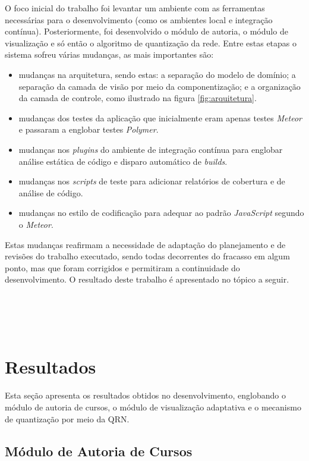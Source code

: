 O foco inicial do trabalho foi levantar um ambiente com as ferramentas necessárias para o desenvolvimento (como os ambientes local e integração contínua). Posteriormente, foi desenvolvido o módulo de autoria, o  módulo de visualização e só então o algoritmo de quantização da rede. Entre estas etapas o sistema sofreu várias mudanças, as mais importantes são: 
\begin{itemize}
	\item mudanças na arquitetura, sendo estas: a separação do modelo de domínio; a separação da camada de visão por meio da componentização; e a organização da camada de controle, como ilustrado na figura \ref{fig:arquitetura}.
	\item mudanças dos testes da aplicação que inicialmente eram apenas testes \textit{Meteor} e passaram a englobar testes \textit{Polymer}.
	\item mudanças nos \textit{plugins} do ambiente de integração contínua para englobar análise estática de código e disparo automático de \textit{builds}.
	\item mudanças nos \textit{scripts} de teste para adicionar relatórios de cobertura e de análise de código.
	\item mudanças no estilo de codificação para adequar ao padrão \textit{JavaScript} segundo o \textit{Meteor}.
\end{itemize}

Estas mudanças reafirmam a necessidade de adaptação do planejamento e de revisões do trabalho executado, sendo todas decorrentes do fracasso em algum ponto, mas que foram corrigidos e permitiram a continuidade do desenvolvimento. O resultado deste trabalho é apresentado no tópico a seguir. 
\\
\\
\\
\\
\\

\section{Resultados}

Esta seção apresenta os resultados obtidos no desenvolvimento, englobando o módulo de autoria de cursos, o módulo de visualização adaptativa e o mecanismo de quantização por meio da QRN.

\subsection{Módulo de Autoria de Cursos}

